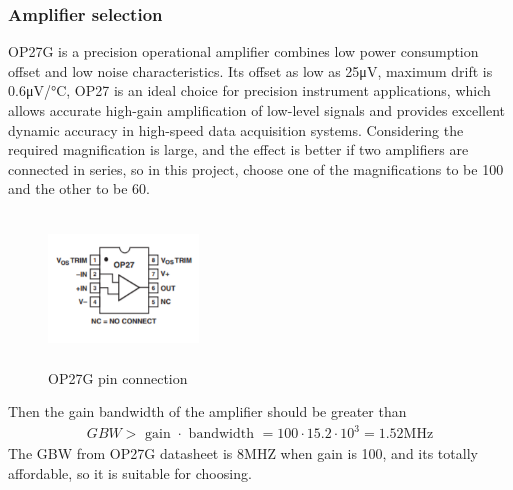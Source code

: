 \subsubsection{Amplifier selection}
OP27G is a precision operational amplifier combines low power consumption offset and low noise characteristics. Its offset as low as 25μV, maximum drift is 0.6μV/°C, OP27 is an ideal choice for precision instrument applications, which allows accurate high-gain amplification of low-level signals and provides excellent dynamic accuracy in high-speed data acquisition systems.
Considering the required magnification is large, and the effect is better if two amplifiers are connected in series, so in this project, choose one of the magnifications to be 100 and the other to be 60.
\begin{figure}[H]
    \centering
    \includegraphics[width=4cm,height=4cm]{figure/OP27Gpin.PNG}
    \caption{OP27G pin connection}
\end{figure}
Then the gain bandwidth of the amplifier should be greater than
 \begin{align}
G B W>\text { gain }\cdot\text { bandwidth }=100\cdot15.2\cdot 10^{3}=1.52 \mathrm{MHz}
\end{align}
The GBW from OP27G datasheet is 8MHZ when gain is 100, and its totally affordable, so it is suitable for choosing.
